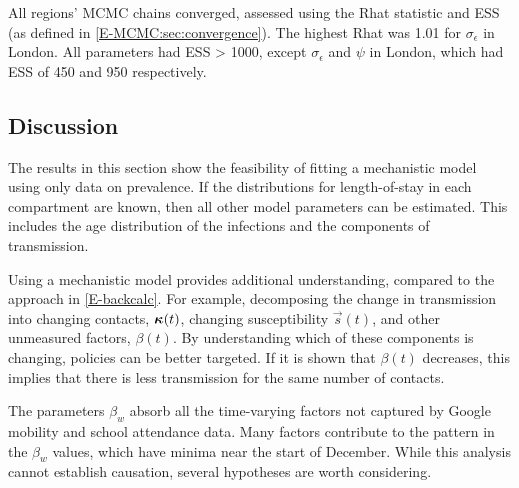 \documentclass[thesis.tex]{subfiles}
\begin{document}
All regions' MCMC chains converged, assessed using the Rhat statistic and ESS (as defined in \cref{E-MCMC:sec:convergence}).
The highest Rhat was 1.01 for $\sigma_\epsilon$ in London.
All parameters had ESS > 1000, except $\sigma_\epsilon$ and $\psi$ in London, which had ESS of 450 and 950 respectively.

\subsection{Discussion} \label{SEIR:sec:discussion}

The results in this section show the feasibility of fitting a mechanistic model using only data on prevalence.
If the distributions for length-of-stay in each compartment are known, then all other model parameters can  be estimated.
This includes the age distribution of the infections and the components of transmission.

Using a mechanistic model provides additional understanding, compared to the approach in \cref{E-backcalc}.
For example, decomposing the change in transmission into changing contacts, $\bm{\kappa}(t)$, changing susceptibility $\vec{s}(t)$, and other unmeasured factors, $\beta(t)$.
By understanding which of these components is changing, policies can be better targeted.
If it is shown that $\beta(t)$ decreases, this implies that there is less transmission for the same number of contacts.


The parameters $\beta_w$ absorb all the time-varying factors not captured by Google mobility and school attendance data.
Many factors contribute to the pattern in the $\beta_w$ values, which have minima near the start of December.
While this analysis cannot establish causation, several hypotheses are worth considering.
\end{document}
